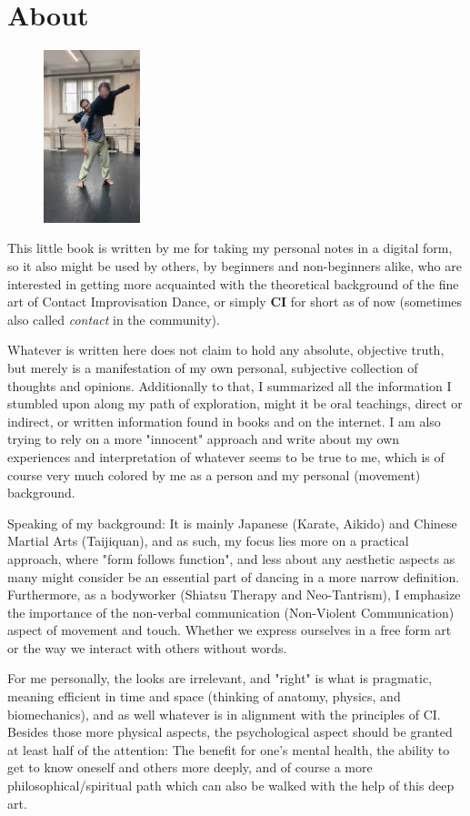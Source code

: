 \section{About}

\begin{figure}
\centering
\includegraphics[width=0.25\textwidth]{images/about.jpg}
\end{figure}

This little book is written by me for taking my personal notes in a digital form, so it also might be used by others, by beginners and non-beginners alike, who are interested in getting more acquainted with the theoretical background of the fine art of Contact Improvisation Dance, or simply \textbf{CI} for short as of now (sometimes also called \textit{contact} in the community).

Whatever is written here does not claim to hold any absolute, objective truth, but merely is a manifestation of my own personal, subjective collection of thoughts and opinions. Additionally to that, I summarized all the information I stumbled upon along my path of exploration, might it be oral teachings, direct or indirect, or written information found in books and on the internet. I am also trying to rely on a more "innocent" approach and write about my own experiences and interpretation of whatever seems to be true to me, which is of course very much colored by me as a person and my personal (movement) background.

Speaking of my background: It is mainly Japanese (Karate, Aikido) and Chinese Martial Arts (Taijiquan), and as such, my focus lies more on a practical approach, where "form follows function", and less about any aesthetic aspects as many might consider be an essential part of dancing in a more narrow definition. Furthermore, as a bodyworker (Shiatsu Therapy and Neo-Tantrism), I emphasize the importance of the non-verbal communication (Non-Violent Communication) aspect of movement and touch. Whether we express ourselves in a free form art or the way we interact with others without words.

For me personally, the looks are irrelevant, and "right" is what is pragmatic, meaning efficient in time and space (thinking of anatomy, physics, and biomechanics), and as well whatever is in alignment with the principles of CI. Besides those more physical aspects, the psychological aspect should be granted at least half of the attention: The benefit for one's mental health, the ability to get to know oneself and others more deeply, and of course a more philosophical/spiritual path which can also be walked with the help of this deep art.
